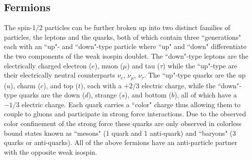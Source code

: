 \subsection{Fermions} \label{sec:theory:fermions}

The spin-1/2 particles can be further broken up into two distinct families of
particles, the leptons and the quarks, both of which contain three
``generations" each with an ``up"- and ``down"-type particle where ``up" and
``down" differentiate the two components of the weak isospin doublet.  The
``down"-type leptons are the electrically charged electron ($e$), muon ($\mu$)
and tau ($\tau$) while the ``up"-type are their electrically neutral
counterparts $\nu_e$, $\nu_\mu$, $\nu_\tau$. The ``up"-type quarks are the up
($u$), charm ($c$), and top ($t$), each with a $+2/3$ electric charge, while
the ``down"-type quarks are the down ($d$), strange ($s$), and bottom ($b$),
all of which have a $-1/3$ electric charge.  Each quark carries a ``color"
charge thus allowing them to couple to gluons and  participate in strong force
interactions.  Due to the observed color confinement of the strong force these
quarks are only observed in colorless bound states known as ``mesons" (1 quark
and 1 anti-quark) and ``baryons" (3 quarks or anti-quarks).  All of the above
fermions have an anti-particle partner with the opposite weak isospin.
